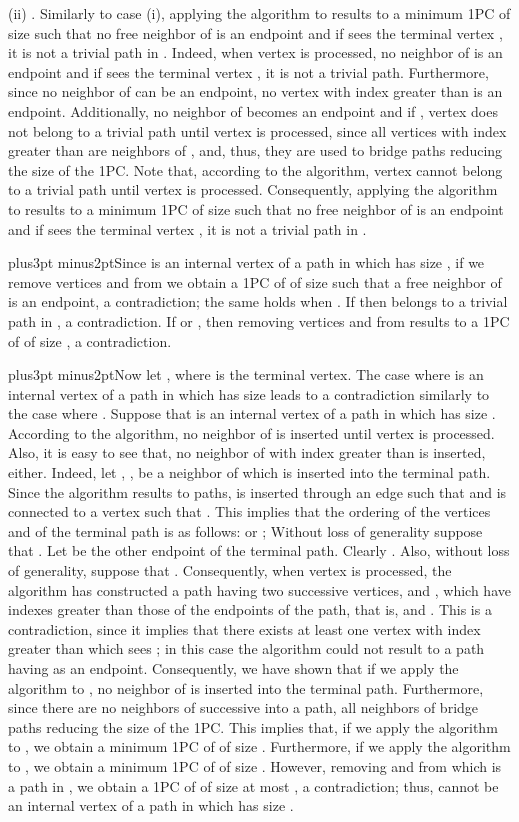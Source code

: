 \documentclass[10pt]{article}
\def\yskip{\penalty-50\vskip3pt plus3pt minus2pt}
\def\y{\yskip}
\begin{document}
{(ii) . Similarly to case (i), applying the algorithm to
 results to a minimum 1PC
 of size
 such that no free neighbor of 
is an endpoint and if  sees the terminal vertex , it is
not a trivial path in . Indeed, when
vertex  is processed, no neighbor of  is an endpoint
and if  sees the terminal vertex , it is not a trivial
path. Furthermore, since no neighbor of  can be an endpoint,
no vertex with index greater than  is an endpoint.
Additionally, no neighbor of  becomes an endpoint and if
, vertex  does not belong to a trivial path
until vertex  is processed, since all vertices with index
greater than  are neighbors of , and, thus, they are
used to bridge paths reducing the size of the 1PC. Note that,
according to the algorithm, vertex  cannot belong to a
trivial path until vertex  is processed. Consequently,
applying the algorithm to  results to a minimum 1PC
 of size
 such that no free neighbor of 
is an endpoint and if  sees the terminal vertex , it is
not a trivial path in .

\y Since  is an internal vertex of a path  in 
which has size , if we remove vertices
 and  from  we obtain a 1PC of  of
size  such that a free neighbor of
 is an endpoint, a contradiction; the same holds when
 . If  then  belongs to a trivial path in
, a contradiction. If  or , then removing
vertices  and  from  results to a 1PC of
 of size , a contradiction.

\y Now let , where  is the terminal vertex.
The case where  is an internal vertex of a path  in
 which has size
 leads to a contradiction similarly to
the case where . Suppose that  is an
internal vertex of a path  in
 which has size
. According to the algorithm, no
neighbor of  is inserted until vertex  is processed.
Also, it is easy to see that, no neighbor of  with index
greater than  is inserted, either. Indeed, let , ,
be a neighbor of  which is inserted into the terminal path.
Since the algorithm results to 
paths,  is inserted through an edge  such that
 and  is connected to a vertex
 such that . This implies that the
ordering of the vertices  and  of the
terminal path is as follows:  or
; Without loss of generality suppose that
. Let  be the other endpoint of the
terminal path. Clearly . Also, without loss of
generality, suppose that . Consequently, when vertex
 is processed, the algorithm has constructed a path having
two successive vertices,  and , which have indexes
greater than those of the endpoints of the path, that is, 
and . This is a contradiction, since it implies that there
exists at least one vertex with index greater than  which sees
; in this case the algorithm could not result to a path
having  as an endpoint. Consequently, we have shown that if
we apply the algorithm to , no neighbor of  is inserted
into the terminal path. Furthermore, since there are no neighbors
of  successive into a path, all neighbors of  bridge
paths reducing the size of the 1PC. This implies that, if we apply
the algorithm to , we obtain a minimum 1PC of
 of size . Furthermore,
if we apply the algorithm to , we obtain a
minimum 1PC of  of size
. However, removing  and
 from  which is a path in
, we obtain a 1PC of
 of size at most , a
contradiction; thus,  cannot be an internal vertex of a path
 in
 which has size
.

}
\end{document}
